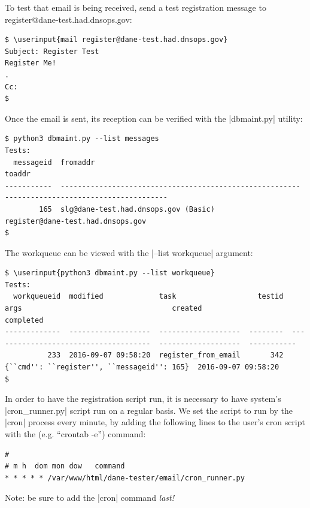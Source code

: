 \documentclass[preprint,3p,11pt]{elsarticle}
\newcommand\userinput[1]{\textbf{#1}}
\begin{document}
To test that email is being received, send a test registration message
to register@dane-test.had.dnsops.gov:

\begin{Verbatim}[commandchars=\\\{\}]
$ \userinput{mail register@dane-test.had.dnsops.gov}
Subject: Register Test
Register Me!
.
Cc:
$
\end{Verbatim}

Once the email is sent, its reception can be verified with the
|dbmaint.py| utility:

\begin{Verbatim}[commandchars=\\\{\}]
$ python3 dbmaint.py --list messages
Tests:
  messageid  fromaddr                                                  toaddr                                    
-----------  --------------------------------------------------------  --------------------------------------
        165  slg@dane-test.had.dnsops.gov (Basic)                      register@dane-test.had.dnsops.gov         
$
\end{Verbatim}

The workqueue can be viewed with the |--list workqueue| argument:

\begin{Verbatim}[commandchars=\\\{\}]
$ \userinput{python3 dbmaint.py --list workqueue}
Tests:
  workqueueid  modified             task                   testid  args                                   created                completed
-------------  -------------------  -------------------  --------  -------------------------------------  -------------------  -----------
          233  2016-09-07 09:58:20  register_from_email       342  {``cmd'': ``register'', ``messageid'': 165}  2016-09-07 09:58:20
$
\end{Verbatim}


In order to have the registration script run, it is necessary to have
system's |cron_runner.py| script run on a regular basis. We set the
script to run by the |cron| process every minute, by adding the
following lines to the user's cron script with the (e.g. ``crontab
-e'') command:

\begin{Verbatim}
#
# m h  dom mon dow   command
* * * * * /var/www/html/dane-tester/email/cron_runner.py
\end{Verbatim}

Note: be sure to add the |cron| command \emph{last!}
\end{document}
